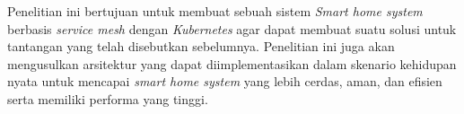 Penelitian ini bertujuan untuk membuat sebuah sistem \textit{Smart home system} berbasis \textit{service mesh} dengan \textit{Kubernetes} agar dapat membuat suatu solusi untuk tantangan yang telah disebutkan sebelumnya. Penelitian ini juga akan mengusulkan arsitektur yang dapat diimplementasikan dalam skenario kehidupan nyata untuk mencapai \textit{smart home system} yang lebih cerdas, aman, dan efisien serta memiliki performa yang tinggi.